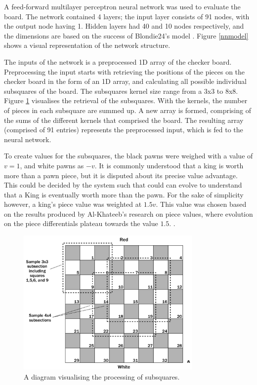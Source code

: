 \documentclass[12pt,a4paper]{article}
\begin{document}
        A feed-forward multilayer perceptron neural network was used to evaluate the board. The network contained 4 layers; the input layer consists of 91 nodes, with the output node having 1. Hidden layers had 40 and 10 nodes respectively, and the dimensions are based on the success of Blondie24's model \cite{chellapilla_evolving_1999}. Figure \ref{nnmodel} shows a visual representation of the network structure.

        The inputs of the network is a preprocessed 1D array of the checker board. Preprocessing the input starts with retrieving the positions of the pieces on the checker board in the form of an 1D array, and calculating all possible individual subsquares of the board. The subsquares kernel size range from a 3x3 to 8x8. Figure \ref{subsquares} visualises the retrieval of the subsquares. With the kernels, the number of pieces in each subsquare are summed up. A new array is formed, comprising of the sums of the different kernels that comprised the board. The resulting array (comprised of 91 entries) represents the preprocessed input, which is fed to the neural network.

        To create values for the subsquares, the black pawns were weighed with a value of $v=1$, and white pawns as $-v$. It is commonly understood that a king is worth more than a pawn piece, but it is disputed about its precise value advantage. This could be decided by the system such that could can evolve to understand that a King is eventually worth more than the pawn. For the sake of simplicity however, a king's piece value was weighted at $1.5v$. This value was chosen based on the results produced by Al-Khateeb's research on piece values, where evolution on the piece differentials plateau towards the value $1.5$. \cite{al-khateeb_importance_2010}.

        \begin{figure}[!ht]
            \centering
            \includegraphics[width=90mm]{images/subsquares.png}
            \caption{A diagram visualising the processing of subsquares.\label{subsquares}}
        \end{figure}
\end{document}
